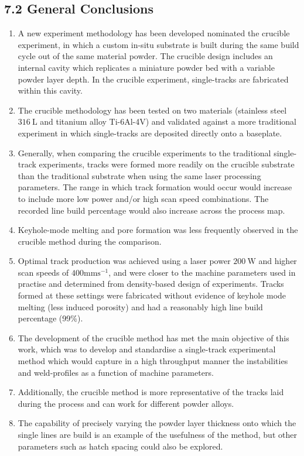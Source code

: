 \documentclass[10pt]{article}
\begin{document}
\subsection*{7.2 General Conclusions}
\begin{enumerate}
  \item A new experiment methodology has been developed nominated the crucible experiment, in which a custom in-situ substrate is built during the same build cycle out of the same material powder. The crucible design includes an internal cavity which replicates a miniature powder bed with a variable powder layer depth. In the crucible experiment, single-tracks are fabricated within this cavity.

  \item The crucible methodology has been tested on two materials (stainless steel $316 \mathrm{~L}$ and titanium alloy Ti-6Al-4V) and validated against a more traditional experiment in which single-tracks are deposited directly onto a baseplate.

  \item Generally, when comparing the crucible experiments to the traditional single-track experiments, tracks were formed more readily on the crucible substrate than the traditional substrate when using the same laser processing parameters. The range in which track formation would occur would increase to include more low power and/or high scan speed combinations. The recorded line build percentage would also increase across the process map.

  \item Keyhole-mode melting and pore formation was less frequently observed in the crucible method during the comparison.

  \item Optimal track production was achieved using a laser power $200 \mathrm{~W}$ and higher scan speeds of $400 \mathrm{mms}^{-1}$, and were closer to the machine parameters used in practise and determined from density-based design of experiments. Tracks formed at these settings were fabricated without evidence of keyhole mode melting (less induced porosity) and had a reasonably high line build percentage (99\%).

  \item The development of the crucible method has met the main objective of this work, which was to develop and standardise a single-track experimental method which would capture in a high throughput manner the instabilities and weld-profiles as a function of machine parameters.

  \item Additionally, the crucible method is more representative of the tracks laid during the process and can work for different powder alloys.

  \item The capability of precisely varying the powder layer thickness onto which the single lines are build is an example of the usefulness of the method, but other parameters such as hatch spacing could also be explored.

\end{enumerate}
\end{document}
